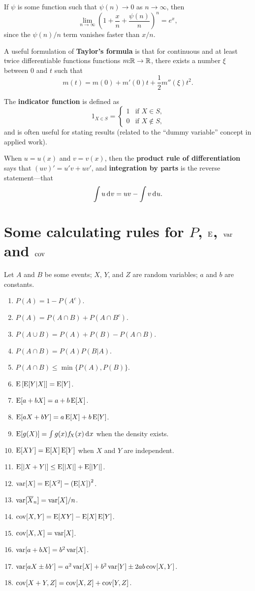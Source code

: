 \documentclass[10pt]{article}
\begin{document}
If $\psi$ is some function such that $\psi(n) \rightarrow 0$ as $n\rightarrow\infty$,
then \[ \lim_{n\rightarrow\infty} \left(1 + \frac{x}{n} + \frac{\psi(n)}{n}  \right)^n = e^x,\]
since the $\psi(n)/n$ term vanishes faster than $x/n$.

A useful formulation of \textbf{Taylor's formula} is that for continuous and at
least twice differentiable functions functions $m\!\!:\!\!\mathbb{R} \rightarrow \mathbb{R}$, there
exists a number $\xi$ between $0$ and $t$ such that \[ m(t) = m(0) + m'(0) t +
\frac{1}{2} m''(\xi) t^2.\]

The \textbf{indicator function} is defined as 
\[ 1_{X\in S} = \begin{cases} 1 & \text{if $X\in S$,} \\ 0 & \text{if $X\notin S$,}\end{cases}\]
and is often useful for stating results (related to the ``dummy variable'' concept in applied work).



When $u=u(x)$ and $v=v(x)$, then the \textbf{product rule of differentiation}
says that $(u v)' = u'v + u v'$,  and \textbf{integration by parts} is the reverse statement---that
\[\int u \rd v = u v - \int v \rd u. \]

\section{Some calculating rules for $P$, $\operatorname{E}$, $\operatorname{var}$ and $\operatorname{cov}$}
Let $A$ and $B$ be some events; $X$, $Y$, and $Z$ are random variables; $a$ and $b$
are constants.
\begin{enumerate}
\item $P(A) = 1 - P(A^c)$.
\item $P(A) = P(A\cap B) + P(A\cap B^c)$.
\item $P(A\cup B) = P(A) + P(B) - P(A\cap B)$.
\item $P(A \cap B) = P(A)P(B|A)$.
\item $P(A\cap B) \leq \min\{P(A), P(B)\}$.
\item $\operatorname{E}\left[\operatorname{E}[Y|X]\right] = \operatorname{E}[Y]$.
\item $\operatorname{E}[a + bX ] = a + b\operatorname{E}[X]$.
\item $\operatorname{E}[a X + b Y] = a\operatorname{E}[X] + b\operatorname{E}[Y]$.
\item $\E[g(X)] = \int g(x) f_{\!X}(x) \rd x$ when the density exists.
\item $\operatorname{E}[XY] = \operatorname{E}[X]\operatorname{E}[Y]$ when $X$ and $Y$ are independent.
\item $\operatorname{E}[|X+Y|] \leq \operatorname{E}[|X|] + \operatorname{E}[|Y|]$.
\item $\operatorname{var}[X] = \operatorname{E}[X^2] - \left(\operatorname{E}[X]\right)^2$.
\item $\operatorname{var}[\overline{X}_n] = \operatorname{var}[X] / n$. 
\item $\operatorname{cov}[X,Y] = \operatorname{E}[XY] - \operatorname{E}[X]\operatorname{E}[Y]$.
\item $\operatorname{cov}[X,X] = \operatorname{var}[X]$.
\item $\operatorname{var}[a + bX] = b^2 \operatorname{var}[X]$.
\item $\operatorname{var}[a X \pm b Y] = a^2 \operatorname{var}[X] + b^2 \operatorname{var}[Y] \pm 2 a b \operatorname{cov}[X,Y]$.
\item $\operatorname{cov}[X+Y,Z] =  \operatorname{cov}[X,Z] + \operatorname{cov}[Y,Z]$.
\end{enumerate}
\end{document}
